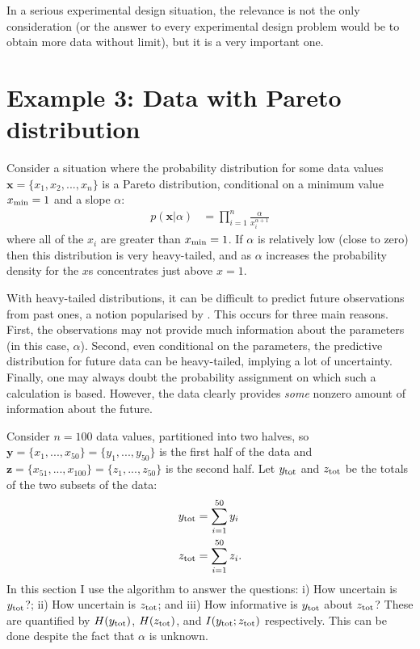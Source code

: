 \documentclass[entropy,article,accept,oneauthor,pdftex,10pt,a4paper]{mdpi}
\newcommand{\ytot}{y_{\rm tot}}
\newcommand{\ztot}{z_{\rm tot}}
\begin{document}
In a serious experimental design situation, the relevance is not the only
consideration (or the answer to every experimental design problem would
be to obtain more data without limit), but it is a very important one.

\section{Example 3: Data with Pareto distribution}

Consider a situation where the probability distribution for some data values
$\boldsymbol{x} = \{x_1, x_2, ..., x_n\}$ is a Pareto distribution, conditional on
a minimum value $x_{\rm min}=1$ and a slope $\alpha$:
\begin{align}
p(\boldsymbol{x} | \alpha) &= \prod_{i=1}^n \frac{\alpha}{x_i^{\alpha + 1}}
\end{align}
where all of the $x_i$ are greater than $x_{\rm min} = 1$.
If $\alpha$ is relatively low (close to zero) then this distribution is
very heavy-tailed, and as $\alpha$ increases the probability density
for the $x$s concentrates just above $x=1$.

With heavy-tailed distributions, it can be difficult to predict future
observations from past ones, a notion popularised by
\citet{taleb2007black}. This occurs for three main reasons.
First, the observations may not
provide much information about the parameters (in this case, $\alpha$).
Second, even conditional on the parameters, the predictive distribution for
future data can be heavy-tailed, implying a lot of uncertainty.
Finally, one may always doubt the probability assignment on which such a
calculation is based.
However, the data clearly provides {\em some} nonzero
amount of information about the future.

Consider $n=100$ data values, partitioned into two halves, so
$\boldsymbol{y} = \{x_1, ..., x_{50}\} = \{y_1, ..., y_{50}\}$
is the first half of the data and
$\boldsymbol{z} = \{x_{51}, ..., x_{100}\} = \{z_1, ..., z_{50}\}$
is the second half. Let $\ytot$ and $\ztot$ be the totals of the two
subsets of the data:
\begin{align}
\ytot &= \sum_{i=1}^{50} y_i \\
\ztot &= \sum_{i=1}^{50} z_i.
\end{align}
In this section I use the algorithm to answer the questions:
i) How uncertain is $\ytot$?; ii) How uncertain is $\ztot$; and
iii) How informative is $\ytot$ about $\ztot$? These are quantified by
$H(\ytot)$, $H(\ztot)$, and $I(\ytot; \ztot)$ respectively. This can
be done despite the fact that $\alpha$ is unknown.
\end{document}
